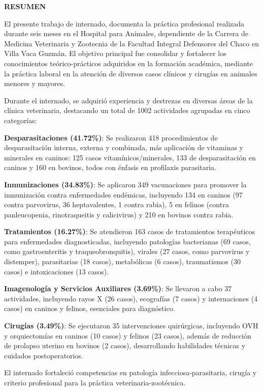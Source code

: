 \clearpage


\begin{center}
	\textbf{RESUMEN}
\end{center}

El presente trabajo de internado, documenta la práctica profesional realizada durante seis meses en el Hospital para Animales, dependiente de la Carrera de Medicina Veterinaria y Zootecnia de la Facultad Integral Defensores del Chaco en Villa Vaca Guzmán. El objetivo principal fue consolidar y fortalecer los conocimientos teórico-prácticos adquiridos en la formación académica, mediante la práctica laboral en la atención de diversos casos clínicos y cirugías en animales menores y mayores.

Durante el internado, se adquirió experiencia y destrezas en diversas áreas de la clínica veterinaria, destacando un total de 1002 actividades agrupadas en cinco categorías:

\textbf{Desparasitaciones (41.72\%)}: Se realizaron 418 procedimientos de desparasitación interna, externa y combinada, más aplicación de vitaminas y minerales en caninos: 125 casos vitamínicos/minerales, 133 de desparasitación en caninos y 160 en bovinos, todos con énfasis en profilaxis parasitaria.

\textbf{Inmunizaciones (34.83\%)}: Se aplicaron 349 vacunaciones para promover la inmunización contra enfermedades endémicas, incluyendo 134 en caninos (97 contra parvovirus, 36 heptavalentes, 1 contra rabia), 5 en felinos (contra panleucopenia, rinotraqueitis y calicivirus) y 210 en bovinos contra rabia.

\textbf{Tratamientos (16.27\%)}: Se atendieron 163 casos de tratamientos terapéuticos para enfermedades diagnosticadas, incluyendo patologías bacterianas (69 casos, como gastroenteritis y traqueobronquitis), virales (27 casos, como parvovirus y distemper), parasitarias (18 casos), metabólicas (6 casos), traumatismos (30 casos) e intoxicaciones (13 casos).

\textbf{Imagenología y Servicios Auxiliares (3.69\%)}: Se llevaron a cabo 37 actividades, incluyendo rayos X (26 casos), ecografías (7 casos) y internaciones (4 casos) en caninos y felinos, esenciales para diagnóstico.

\textbf{Cirugías (3.49\%)}: Se ejecutaron 35 intervenciones quirúrgicas, incluyendo OVH y orquiectomías en caninos (10 casos) y felinos (23 casos), además de reducción de prolapso uterino en bovinos (2 casos), desarrollando habilidades técnicas y cuidados postoperatorios.

El internado fortaleció competencias en patología infecciosa-parasitaria, cirugía y criterio profesional para la práctica veterinaria-zootécnica.
